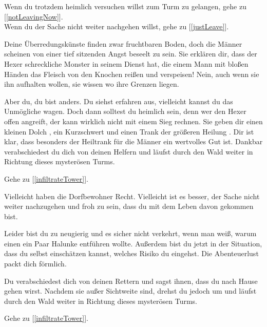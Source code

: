 Wenn du trotzdem heimlich versuchen willst zum Turm zu gelangen, gehe zu [\ref{notLeavingNow}].
\\Wenn du der Sache nicht weiter nachgehen willst, gehe zu [\ref{justLeave}].


Deine Überredungskünste finden zwar fruchtbaren Boden, doch die Männer scheinen von einer tief sitzenden Angst beseelt zu sein. Sie erklären dir, dass der Hexer schreckliche Monster in seinem Dienst hat, die einem Mann mit bloßen Händen das Fleisch von den Knochen reißen und verspeisen! Nein, auch wenn sie ihn aufhalten wollen, sie wissen wo ihre Grenzen liegen.

Aber du, du bist anders. Du siehst erfahren aus, vielleicht kannst du das Unmögliche wagen. Doch dann solltest du heimlich sein, denn wer den Hexer offen angreift, der kann wirklich nicht mit einem Sieg rechnen. Sie geben dir einen kleinen Dolch , ein Kurzschwert  und einen Trank der größeren Heilung . Dir ist klar, dass besonders der Heiltrank für die Männer ein wertvolles Gut ist. Dankbar verabschiedest du dich von deinen Helfern und läufst durch den Wald weiter in Richtung dieses mysterösen Turms.

Gehe zu [\ref{infiltrateTower}].


Vielleicht haben die Dorfbewohner Recht. Vielleicht ist es besser, der Sache nicht weiter nachzugehen und froh zu sein, dass du mit dem Leben davon gekommen bist.

Leider bist du zu neugierig und es sicher nicht verkehrt, wenn man weiß, warum einen ein Paar Halunke entführen wollte. Außerdem bist du jetzt in der Situation, dass du selbst einschätzen kannst, welches Risiko du eingehst. Die Abenteuerlust packt dich förmlich.

Du verabschiedest dich von deinen Rettern und sagst ihnen, dass du nach Hause gehen wirst. Nachdem sie außer Sichtweite sind, drehst du jedoch um und läufst durch den Wald weiter in Richtung dieses mysterösen Turms.

Gehe zu [\ref{infiltrateTower}].
